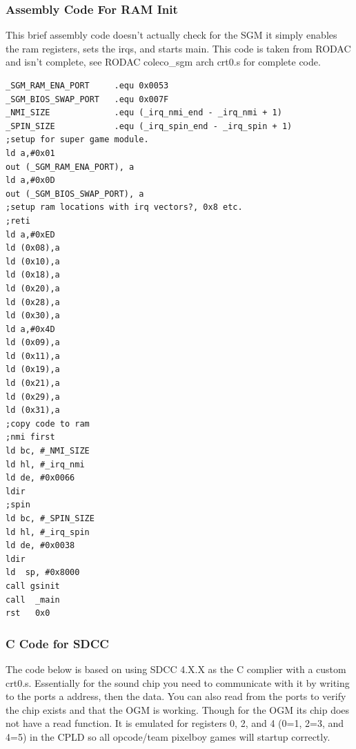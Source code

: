 \subsubsection{Assembly Code For RAM Init}

\par
This brief assembly code doesn't actually check for the SGM it simply enables the ram registers, sets the irqs, and starts main. This code is taken
from RODAC and isn't complete, see RODAC coleco\_sgm arch crt0.s for complete code.

\begin{lstlisting}[language={[x86masm]Assembler}]
_SGM_RAM_ENA_PORT     .equ 0x0053
_SGM_BIOS_SWAP_PORT   .equ 0x007F
_NMI_SIZE             .equ (_irq_nmi_end - _irq_nmi + 1)
_SPIN_SIZE            .equ (_irq_spin_end - _irq_spin + 1)
;setup for super game module.
ld a,#0x01
out (_SGM_RAM_ENA_PORT), a
ld a,#0x0D
out (_SGM_BIOS_SWAP_PORT), a
;setup ram locations with irq vectors?, 0x8 etc.
;reti
ld a,#0xED
ld (0x08),a
ld (0x10),a
ld (0x18),a
ld (0x20),a
ld (0x28),a
ld (0x30),a
ld a,#0x4D
ld (0x09),a
ld (0x11),a
ld (0x19),a
ld (0x21),a
ld (0x29),a
ld (0x31),a
;copy code to ram
;nmi first
ld bc, #_NMI_SIZE
ld hl, #_irq_nmi
ld de, #0x0066
ldir
;spin
ld bc, #_SPIN_SIZE
ld hl, #_irq_spin
ld de, #0x0038
ldir
ld	sp, #0x8000
call gsinit
call  _main
rst   0x0
\end{lstlisting}

\subsubsection{C Code for SDCC}

\par
The code below is based on using SDCC 4.X.X as the C complier with a custom crt0.s. Essentially for the sound chip you
need to communicate with it by writing to the ports a address, then the data. You can also read from the ports to
verify the chip exists and that the OGM is working. Though for the OGM its chip does not have a read function. It is
emulated for registers 0, 2, and 4 (0=1, 2=3, and 4=5) in the CPLD so all opcode/team pixelboy games will startup correctly.

